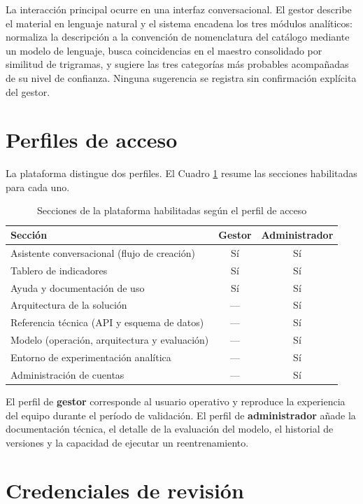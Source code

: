 La interacción principal ocurre en una interfaz conversacional. El gestor describe el material en lenguaje natural y el sistema encadena los tres módulos analíticos: normaliza la descripción a la convención de nomenclatura del catálogo mediante un modelo de lenguaje, busca coincidencias en el maestro consolidado por similitud de trigramas, y sugiere las tres categorías más probables acompañadas de su nivel de confianza. Ninguna sugerencia se registra sin confirmación explícita del gestor.

\section*{Perfiles de acceso}

La plataforma distingue dos perfiles. El Cuadro \ref{tab:accesos-modulos} resume las secciones habilitadas para cada uno.

\begin{table}[!htb]
\centering
\small
\caption{Secciones de la plataforma habilitadas según el perfil de acceso}
\label{tab:accesos-modulos}
\begin{tabular}{lcc}
\toprule
\textbf{Sección} & \textbf{Gestor} & \textbf{Administrador} \\
\midrule
Asistente conversacional (flujo de creación) & Sí & Sí \\
Tablero de indicadores & Sí & Sí \\
Ayuda y documentación de uso & Sí & Sí \\
\midrule
Arquitectura de la solución & --- & Sí \\
Referencia técnica (API y esquema de datos) & --- & Sí \\
Modelo (operación, arquitectura y evaluación) & --- & Sí \\
Entorno de experimentación analítica & --- & Sí \\
Administración de cuentas & --- & Sí \\
\bottomrule
\end{tabular}
\end{table}

El perfil de \textbf{gestor} corresponde al usuario operativo y reproduce la experiencia del equipo durante el período de validación. El perfil de \textbf{administrador} añade la documentación técnica, el detalle de la evaluación del modelo, el historial de versiones y la capacidad de ejecutar un reentrenamiento.

\section*{Credenciales de revisión}

